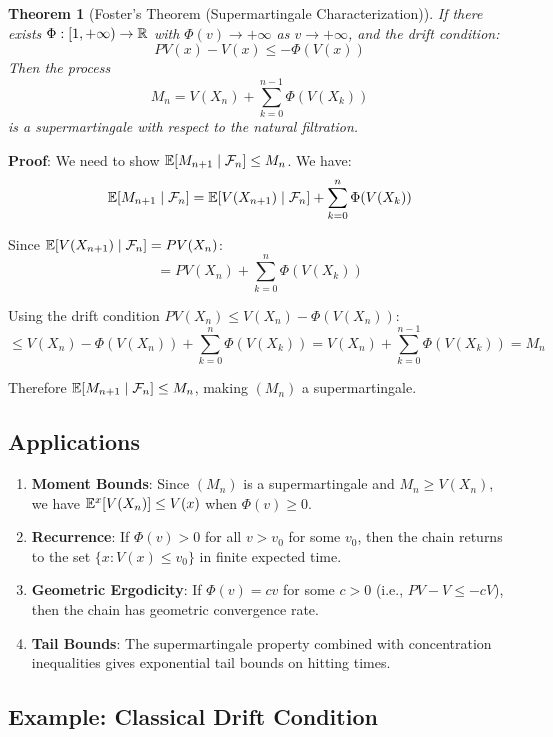 \documentclass{amsart}
\let\originalmathbb\mathbb
\renewcommand{\mathbb}[1]{%
    \ifstrequal{#1}{1}{\mathbbm{#1}}{\originalmathbb{#1}}%
}
\theoremstyle{plain}
\newtheorem{theorem}{Theorem}[section]
\theoremstyle{definition}
\theoremstyle{remark}
\begin{document}
\begin{theorem}[Foster's Theorem (Supermartingale Characterization)]
If there exists $\Phi: [1,+\infty) \to \mathbb{R}$ with $\Phi(v) \to +\infty$ as $v \to +\infty$, and the drift condition:
\[
PV(x) - V(x) \leq -\Phi(V(x))
\]
Then the process
\[
M_n = V(X_n) + \sum_{k=0}^{n-1} \Phi(V(X_k))
\]
is a supermartingale with respect to the natural filtration.
\end{theorem}
\textbf{Proof}: We need to show $\mathbb{E}[M_{n+1} \mid \mathcal{F}_n] \leq M_n$. We have:
\[
\mathbb{E}[M_{n+1} \mid \mathcal{F}_n] = \mathbb{E}[V(X_{n+1}) \mid \mathcal{F}_n] + \sum_{k=0}^{n} \Phi(V(X_k))
\]

Since $\mathbb{E}[V(X_{n+1}) \mid \mathcal{F}_n] = PV(X_n)$:
\[
= PV(X_n) + \sum_{k=0}^{n} \Phi(V(X_k))
\]

Using the drift condition $PV(X_n) \leq V(X_n) - \Phi(V(X_n))$:
\[
\leq V(X_n) - \Phi(V(X_n)) + \sum_{k=0}^{n} \Phi(V(X_k)) = V(X_n) + \sum_{k=0}^{n-1} \Phi(V(X_k)) = M_n
\]

Therefore $\mathbb{E}[M_{n+1} \mid \mathcal{F}_n] \leq M_n$, making $(M_n)$ a supermartingale.

\subsection{Applications}

\begin{enumerate}
	\item \textbf{Moment Bounds}: Since $(M_n)$ is a supermartingale and $M_n \geq V(X_n)$, we have $\mathbb{E}^x[V(X_n)] \leq V(x)$ when $\Phi(v) \geq 0$.
	\item \textbf{Recurrence}: If $\Phi(v) > 0$ for all $v > v_0$ for some $v_0$, then the chain returns to the set $\{x: V(x) \leq v_0\}$ in finite expected time.
	\item \textbf{Geometric Ergodicity}: If $\Phi(v) = cv$ for some $c > 0$ (i.e., $PV - V \leq -cV$), then the chain has geometric convergence rate.
	\item \textbf{Tail Bounds}: The supermartingale property combined with concentration inequalities gives exponential tail bounds on hitting times.
\end{enumerate}

\subsection{Example: Classical Drift Condition}
\end{document}
